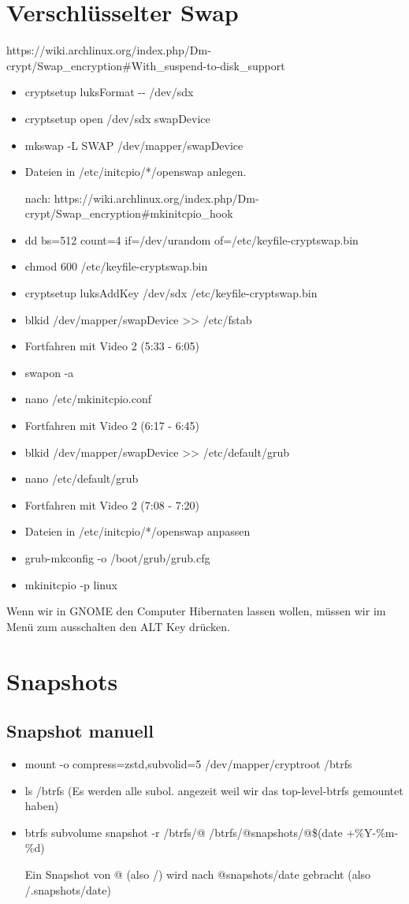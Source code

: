 \documentclass[11pt,a4paper]{article}
\begin{document}
\section{Verschlüsselter Swap}
https://wiki.archlinux.org/index.php/Dm-crypt/Swap\_encryption\#With\_suspend-to-disk\_support
\begin{itemize}
\item cryptsetup luksFormat -{}-\textcolor{red}{}  /dev/sdx

\item cryptsetup open /dev/sdx swapDevice
\item mkswap -L SWAP /dev/mapper/swapDevice
\item Dateien in /etc/initcpio/*/openswap anlegen.

nach: https://wiki.archlinux.org/index.php/Dm-crypt/Swap\_encryption\#mkinitcpio\_hook
\item dd bs=512 count=4 if=/dev/urandom of=/etc/keyfile-cryptswap.bin
\item chmod 600 /etc/keyfile-cryptswap.bin
\item cryptsetup luksAddKey /dev/sdx /etc/keyfile-cryptswap.bin
\item blkid /dev/mapper/swapDevice >{}> /etc/fstab
\item Fortfahren mit Video 2 (5:33 - 6:05)
\item swapon -a
\item nano /etc/mkinitcpio.conf 
\item Fortfahren mit Video 2 (6:17 - 6:45)
\item blkid /dev/mapper/swapDevice >{}> /etc/default/grub
\item nano /etc/default/grub
\item Fortfahren mit Video 2 (7:08 - 7:20)
\item Dateien in /etc/initcpio/*/openswap anpassen
\item grub-mkconfig -o /boot/grub/grub.cfg
\item mkinitcpio -p linux 
\end{itemize}
Wenn wir in GNOME den Computer Hibernaten lassen wollen, müssen wir im Menü zum ausschalten den ALT Key drücken.
\section{Snapshots}
\subsection{Snapshot manuell}
\begin{itemize}
\item mount -o compress=zstd,subvolid=5 /dev/mapper/cryptroot /btrfs
\item ls /btrfs (Es werden alle subol. angezeit weil wir das top-level-btrfs gemountet haben)
\item btrfs subvolume snapshot -r /btrfs/@ /btrfs/@snapshots/@\$(date +\%Y-\%m-\%d)

Ein Snapshot von @ (also /) wird nach @snapshots/date gebracht (also /.snapshots/date)
\end{itemize}
\end{document}
